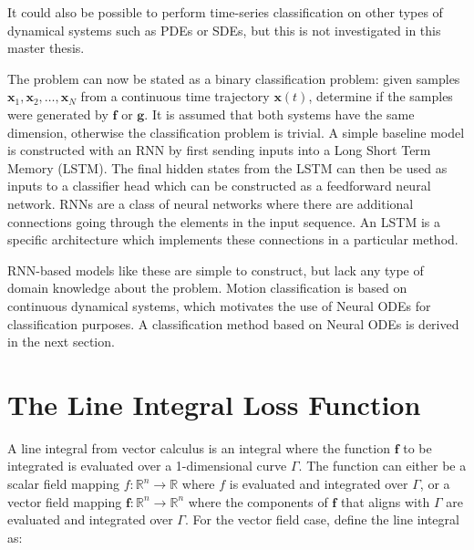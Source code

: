 \documentclass[12pt,a4paper]{book}
\begin{document}
It could also be possible to perform time-series classification on other types of dynamical systems such as PDEs or SDEs, but this is not investigated in this master thesis.

The problem can now be stated as a binary classification problem: given samples $\bm{x}_1, \bm{x}_2, \dots, \bm{x}_N$ from a continuous time trajectory $\bm{x}(t)$, determine if the samples were generated by $\bm{f}$ or $\bm{g}$. It is assumed that both systems have the same dimension, otherwise the classification problem is trivial. A simple baseline model is constructed with an RNN by first sending inputs into a Long Short Term Memory (LSTM). The final hidden states from the LSTM can then be used as inputs to a classifier head which can be constructed as a feedforward neural network. RNNs are a class of neural networks where there are additional connections going through the elements in the input sequence. An LSTM is a specific architecture which implements these connections in a particular method.

RNN-based models like these are simple to construct, but lack any type of domain knowledge about the problem. Motion classification is based on continuous dynamical systems, which motivates the use of Neural ODEs for classification purposes. A classification method based on Neural ODEs is derived in the next section.

\section{The Line Integral Loss Function}
\label{sec:lineintegralloss}

A line integral from vector calculus is an integral where the function $\bm{f}$ to be integrated is evaluated over a 1-dimensional curve $\Gamma$. The function can either be a scalar field mapping $f: \mathbb{R}^n \rightarrow \mathbb{R}$ where $f$ is evaluated and integrated over $\Gamma$, or a vector field mapping $\bm{f}: \mathbb{R}^n \rightarrow \mathbb{R}^n$ where the components of $\bm{f}$ that aligns with $\Gamma$ are evaluated and integrated over $\Gamma$. For the vector field case, define the line integral as:
\end{document}
